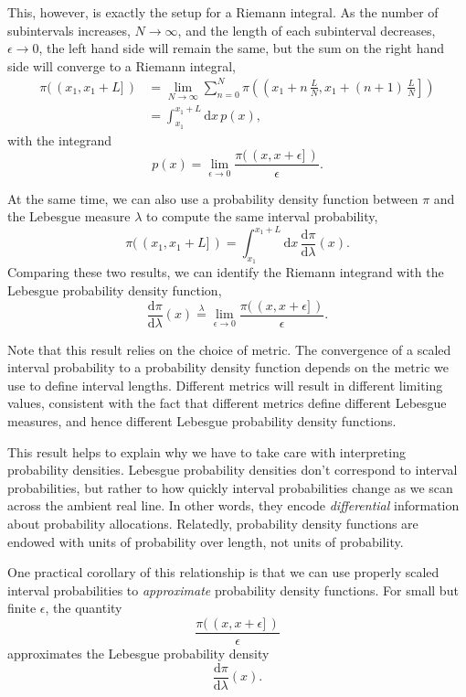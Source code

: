 \documentclass[
  letterpaper,
  DIV=11,
  numbers=noendperiod]{scrartcl}
\begin{document}
This, however, is exactly the setup for a Riemann integral. As the
number of subintervals increases, \(N \rightarrow \infty\), and the
length of each subinterval decreases, \(\epsilon \rightarrow 0\), the
left hand side will remain the same, but the sum on the right hand side
will converge to a Riemann integral, \begin{align*}
\pi( \, ( x_{1}, x_{1} + L ] \, )
&=
\lim_{N \rightarrow \infty}
\sum_{n = 0}^{N}
\pi \left( \left( x_{1} + n \, \frac{L}{N},
                  x_{1} + (n + 1) \, \frac{L}{N} \right] \right)
\\
&=
\int_{x_{1}}^{x_{1} + L} \mathrm{d} x \, p(x),
\end{align*} with the integrand \[
p(x) = \lim_{\epsilon \rightarrow 0}
\frac{ \pi( \, ( x, x + \epsilon ] \, ) }{ \epsilon }.
\]

At the same time, we can also use a probability density function between
\(\pi\) and the Lebesgue measure \(\lambda\) to compute the same
interval probability, \[
\pi( \, ( x_{1}, x_{1} + L ] \, ) =
\int_{x_{1}}^{x_{1} + L} \mathrm{d} x \,
\frac{ \mathrm{d} \pi }{ \mathrm{d} \lambda }(x).
\] Comparing these two results, we can identify the Riemann integrand
with the Lebesgue probability density function, \[
\frac{ \mathrm{d} \pi }{ \mathrm{d} \lambda }(x)
\overset{\lambda}{=}
\lim_{\epsilon \rightarrow 0}
\frac{ \pi( \, ( x, x + \epsilon ] \, ) }{ \epsilon }.
\]

Note that this result relies on the choice of metric. The convergence of
a scaled interval probability to a probability density function depends
on the metric we use to define interval lengths. Different metrics will
result in different limiting values, consistent with the fact that
different metrics define different Lebesgue measures, and hence
different Lebesgue probability density functions.

This result helps to explain why we have to take care with interpreting
probability densities. Lebesgue probability densities don't correspond
to interval probabilities, but rather to how quickly interval
probabilities change as we scan across the ambient real line. In other
words, they encode \emph{differential} information about probability
allocations. Relatedly, probability density functions are endowed with
units of probability over length, not units of probability.

One practical corollary of this relationship is that we can use properly
scaled interval probabilities to \emph{approximate} probability density
functions. For small but finite \(\epsilon\), the quantity \[
\frac{ \pi( \, ( x, x + \epsilon ] \, ) }{ \epsilon }
\] approximates the Lebesgue probability density \[
\frac{ \mathrm{d} \pi }{ \mathrm{d} \lambda }(x).
\]
\end{document}
